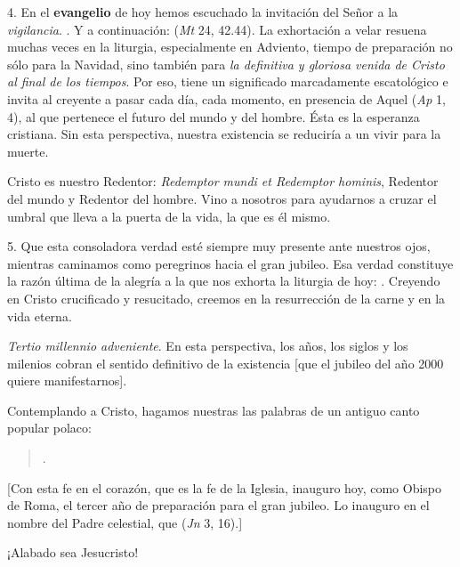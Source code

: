 \begin{body}
	4. En el \textbf{evangelio} de hoy hemos escuchado la invitación del Señor a la \emph{vigilancia}. . Y a continuación:  (\emph{Mt} 24, 42.44). La exhortación a velar resuena muchas veces en la liturgia, especialmente en Adviento, tiempo de preparación no sólo para la Navidad, sino también para \emph{la definitiva y gloriosa venida de Cristo al final de los tiempos}. Por eso, tiene un significado marcadamente escatológico e invita al creyente a pasar cada día, cada momento, en presencia de Aquel  (\emph{Ap} 1, 4), al que pertenece el futuro del mundo y del hombre. Ésta es la esperanza cristiana. Sin esta perspectiva, nuestra existencia se reduciría a un vivir para la muerte. 
	
	Cristo es nuestro Redentor: \emph{Redemptor mundi et Redemptor hominis}, Redentor del mundo y Redentor del hombre. Vino a nosotros para ayudarnos a cruzar el umbral que lleva a la puerta de la vida, la  que es él mismo. 
	
	5. Que esta consoladora verdad esté siempre muy presente ante nuestros ojos, mientras caminamos como peregrinos hacia el gran jubileo. Esa verdad constituye la razón última de la alegría a la que nos exhorta la liturgia de hoy: . Creyendo en Cristo crucificado y resucitado, creemos en la resurrección de la carne y en la vida eterna. 
	
	\emph{Tertio millennio adveniente}. En esta perspectiva, los años, los siglos y los milenios cobran el sentido definitivo de la existencia {[}que el jubileo del año 2000 quiere manifestarnos{]}. 
	
	Contemplando a Cristo, hagamos nuestras las palabras de un antiguo canto popular polaco: 
	
	\begin{quote} 
		.
	\end{quote} 
	
	{[}Con esta fe en el corazón, que es la fe de la Iglesia, inauguro hoy, como Obispo de Roma, el tercer año de preparación para el gran jubileo. Lo inauguro en el nombre del Padre celestial, que  (\emph{Jn} 3, 16).{]} 
	
	¡Alabado sea Jesucristo!
	
\end{body}


